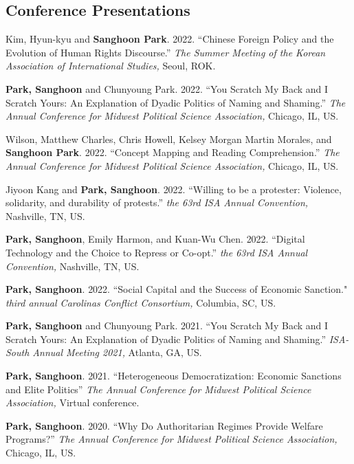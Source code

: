 \documentclass[margin,line]{res}
\begin{document}
\begin{resume}
\section{\sc Conference Presentations}

Kim, Hyun-kyu and {\bf Sanghoon Park}. {2022.} {``Chinese Foreign Policy and the Evolution of Human Rights Discourse.''} {\it The Summer Meeting of the Korean Association of International Studies,} Seoul, ROK.

\vspace{-.25cm}
{\bf Park, Sanghoon} and Chunyoung Park. {2022.} {``You Scratch My Back and I Scratch Yours: An Explanation of Dyadic Politics of Naming and Shaming.''} {\it The Annual Conference for Midwest Political Science Association,} Chicago, IL, US.

\vspace{-.25cm}
Wilson, Matthew Charles, Chris Howell, Kelsey Morgan Martin Morales, and {\bf Sanghoon Park}. {2022.} {``Concept Mapping and Reading Comprehension.''} {\it The Annual Conference for Midwest Political Science Association,} Chicago, IL, US.

\vspace{-.25cm}
Jiyoon Kang and {\bf Park, Sanghoon}. {2022.} {``Willing to be a protester: Violence, solidarity, and durability of protests.''} {\it the 63rd ISA Annual Convention,} Nashville, TN, US.

\vspace{-.25cm}
{\bf Park, Sanghoon}, Emily Harmon, and Kuan-Wu Chen. {2022.} {``Digital Technology and the Choice to Repress or Co-opt.''} {\it the 63rd ISA Annual Convention,} Nashville, TN, US.

\vspace{-.25cm}
{\bf Park, Sanghoon}. {2022.} {``Social Capital and the Success of Economic Sanction."} {\it third annual Carolinas Conflict Consortium,} Columbia, SC, US.

\vspace{-.25cm}
{\bf Park, Sanghoon} and Chunyoung Park. {2021.} {``You Scratch My Back and I Scratch Yours: An Explanation of Dyadic Politics of Naming and Shaming.''} {\it ISA-South Annual Meeting 2021,} Atlanta, GA, US.

\vspace{-.25cm}
{\bf Park, Sanghoon}. {2021.} {``Heterogeneous Democratization: Economic Sanctions and Elite Politics''} {\it The Annual Conference for Midwest Political Science Association,} Virtual conference.

\vspace{-.25cm}
{\bf Park, Sanghoon}. {2020.} {``Why Do Authoritarian Regimes Provide Welfare Programs?''} {\it The Annual Conference for Midwest Political Science Association,} Chicago, IL, US.


\end{resume}
\end{document}
